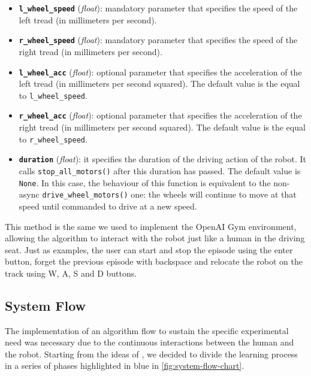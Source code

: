 \begin{itemize}
    \item \textbf{\texttt{l\_wheel\_speed}} (\textit{float}): mandatory parameter that specifies the speed of the left tread (in millimeters per second).
    \item \textbf{\texttt{r\_wheel\_speed}} (\textit{float}): mandatory parameter that specifies the speed of the right tread (in millimeters per second).
    \item \textbf{\texttt{l\_wheel\_acc}} (\textit{float}): optional parameter that specifies the acceleration of the left tread (in millimeters per second squared).
          The default value is the equal to \texttt{l\_wheel\_speed}.
    \item \textbf{\texttt{r\_wheel\_acc}} (\textit{float}): optional parameter that specifies the acceleration of the right tread (in millimeters per second squared).
          The default value is the equal to \texttt{r\_wheel\_speed}.
    \item \textbf{\texttt{duration}} (\textit{float}): it specifies the duration of the driving action of the robot.
          It calls \texttt{stop\_all\_motors()} after this duration has passed.
          The default value is \texttt{None}. In this case, the behaviour of this function is equivalent to the non-async \texttt{drive\_wheel\_motors()} one: the wheels will continue to move at that speed until commanded to drive at a new speed.
\end{itemize}

This method is the same we used to implement the OpenAI Gym environment, allowing the algorithm to interact with the robot just like a human in the driving seat.
Just as examples, the user can start and stop the episode using the enter button, forget the previous episode with backspace and relocate the robot on the track using W, A, S and D buttons.

\subsection{System Flow} \label{subsec:system-flow}

The implementation of an algorithm flow to sustain the specific experimental need was necessary due to the continuous interactions between the human and the robot. Starting from the ideas of \cite{kendall2018learning,kendall2019learning}, we decided to divide the learning process in a series of phases highlighted in blue in \vref{fig:system-flow-chart}.

